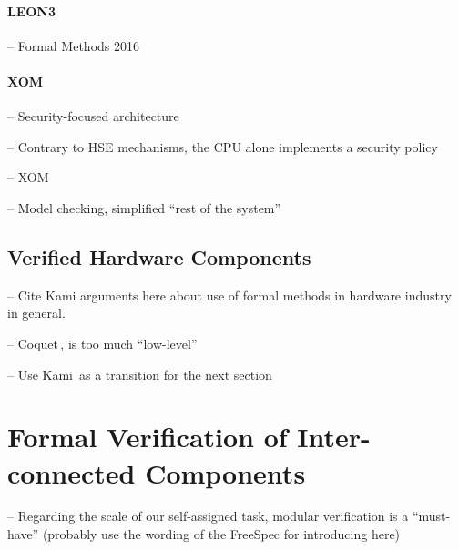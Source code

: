 \paragraph{LEON3}
%
\begin{compactitem}
\item[--] Formal Methods 2016
\end{compactitem}

\paragraph{XOM}
%
\begin{compactitem}
\item[--] Security-focused architecture
\item[--] Contrary to HSE mechanisms, the CPU alone implements a security policy
\item[--] XOM\,\cite{lie2003xom}
\item[--] Model checking, simplified ``rest of the system''
\end{compactitem}

\subsection{Verified Hardware Components}

\begin{compactitem}
\item[--] Cite Kami arguments here about use of formal methods in hardware
  industry in general.
\end{compactitem}

\begin{compactitem}
\item[--] Coquet\,\cite{braibant2011coquet}, is too much ``low-level''
\item[--] Use Kami\,\cite{choi2017kami} as a transition for the next section
\end{compactitem}

\section{Formal Verification of Inter-connected Components} %
\label{sec:relatedwork:modular}

\begin{compactitem}
\item[--] Regarding the scale of our self-assigned task, modular verification is
  a ``must-have'' (probably use the wording of the FreeSpec for introducing
  here)
\end{compactitem}

